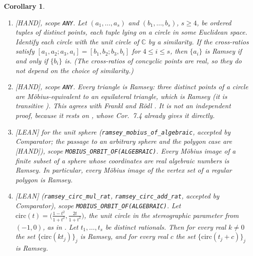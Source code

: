\documentclass[11pt]{amsart}
\newcommand{\st}[1]{\textsf{[#1]}}
\newcommand{\C}{\mathbb{C}}
\newcommand{\circmap}{\mathrm{circ}}
\newcommand{\LeanCorName}{\texttt{ramsey\_mobius\_of\_algebraic}}
\newcommand{\LeanCorCircName}{\texttt{ramsey\_circ\_mul\_rat}, \texttt{ramsey\_circ\_add\_rat}}
\theoremstyle{plain}
\newtheorem{corollary}{Corollary}
\theoremstyle{definition}
\begin{document}
\begin{corollary}\label{cor}
\begin{enumerate}
\item[(a)] \st{HAND}, scope \texttt{ANY}. Let $(a_1,\dots,a_s)$ and $(b_1,\dots,b_s)$, $s\ge4$, be
ordered tuples of distinct points, each tuple lying on a circle in some Euclidean space. Identify
each circle with the unit circle of $\C$ by a similarity. If the cross-ratios satisfy
$[a_1,a_2;a_3,a_i]=[b_1,b_2;b_3,b_i]$ for $4\le i\le s$, then $\{a_i\}$ is Ramsey if and only if
$\{b_i\}$ is. (The cross-ratios of concyclic points are real, so they do not depend on the choice
of similarity.)
\item[(b)] \st{HAND}, scope \texttt{ANY}. Every triangle is Ramsey: three distinct points of a
circle are M\"obius-equivalent to an equilateral triangle, which is Ramsey (it is transitive
\cite[Cor.~7.2]{OAI172}). This agrees with Frankl and R\"odl \cite{FR86}. It is \emph{not} an
independent proof, because it rests on \cite{OAI172}, whose Cor.~7.4 already gives it directly.
\item[(c)] \st{LEAN} for the unit sphere (\LeanCorName, accepted by Comparator;
the passage to an arbitrary sphere and the polygon case are \st{HAND}),
scope \texttt{MOBIUS\_ORBIT\_OF(ALGEBRAIC)}. Every M\"obius image of a finite subset of a sphere
whose coordinates are real algebraic numbers is Ramsey. In particular, every M\"obius image of
the vertex set of a regular polygon is Ramsey.
\item[(d)] \st{LEAN} (\LeanCorCircName, accepted by Comparator),
scope \texttt{MOBIUS\_ORBIT\_OF(ALGEBRAIC)}. Let
$\circmap(t)=\bigl(\tfrac{1-t^2}{1+t^2},\tfrac{2t}{1+t^2}\bigr)$, the unit circle in the
stereographic parameter from $(-1,0)$, as in \cite[Prop.~7.6]{OAI172}. Let $t_1,\dots,t_s$ be
distinct rationals. Then for every real $k\neq0$ the set $\{\circmap(kt_j)\}_j$ is Ramsey, and
for every real $c$ the set $\{\circmap(t_j+c)\}_j$ is Ramsey.
\end{enumerate}
\end{corollary}
\end{document}
